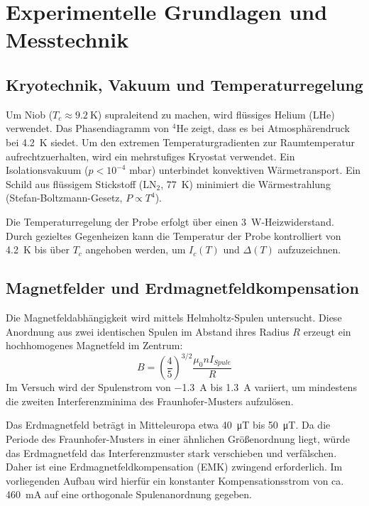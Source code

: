 
\section{Experimentelle Grundlagen und Messtechnik}

\subsection{Kryotechnik, Vakuum und Temperaturregelung}
Um Niob ($T_c \approx \SI{9.2}{\kelvin}$) supraleitend zu machen, wird flüssiges Helium (LHe) verwendet. Das Phasendiagramm von $^4$He zeigt, dass es bei Atmosphärendruck bei \SI{4.2}{\kelvin} siedet. Um den extremen Temperaturgradienten zur Raumtemperatur aufrechtzuerhalten, wird ein mehrstufiges Kryostat verwendet. Ein Isolationsvakuum ($p < 10^{-4}$ mbar) unterbindet konvektiven Wärmetransport. Ein Schild aus flüssigem Stickstoff (LN$_2$, \SI{77}{\kelvin}) minimiert die Wärmestrahlung (Stefan-Boltzmann-Gesetz, $P \propto T^4$). 

Die Temperaturregelung der Probe erfolgt über einen \SI{3}{\watt}-Heizwiderstand. Durch gezieltes Gegenheizen kann die Temperatur der Probe kontrolliert von \SI{4.2}{\kelvin} bis über $T_c$ angehoben werden, um $I_c(T)$ und $\Delta(T)$ aufzuzeichnen.

\subsection{Magnetfelder und Erdmagnetfeldkompensation}
Die Magnetfeldabhängigkeit wird mittels Helmholtz-Spulen untersucht. Diese Anordnung aus zwei identischen Spulen im Abstand ihres Radius $R$ erzeugt ein hochhomogenes Magnetfeld im Zentrum:
\begin{equation}
    B = \left(\frac{4}{5}\right)^{3/2} \frac{\mu_0 n I_{Spule}}{R}
    \label{eq:Spule}
\end{equation}
Im Versuch wird der Spulenstrom von \SI{-1.3}{\ampere} bis \SI{+1.3}{\ampere} variiert, um mindestens die zweiten Interferenzminima des Fraunhofer-Musters aufzulösen. 

Das Erdmagnetfeld beträgt in Mitteleuropa etwa \SI{40}{\micro\tesla} bis \SI{50}{\micro\tesla}. Da die Periode des Fraunhofer-Musters in einer ähnlichen Größenordnung liegt, würde das Erdmagnetfeld das Interferenzmuster stark verschieben und verfälschen. Daher ist eine Erdmagnetfeldkompensation (EMK) zwingend erforderlich. Im vorliegenden Aufbau wird hierfür ein konstanter Kompensationsstrom von ca. \SI{460}{\milli\ampere} auf eine orthogonale Spulenanordnung gegeben.
